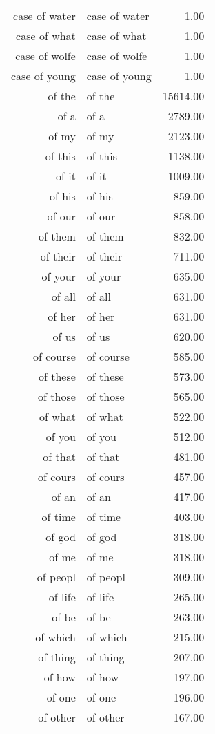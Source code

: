 \begin{table}[ht]
\begin{tabular}{rlr}
  case of water & case of water & 1.00 \\ 
  case of what & case of what & 1.00 \\ 
  case of wolfe & case of wolfe & 1.00 \\ 
  case of young & case of young & 1.00 \\ 
  of the & of the & 15614.00 \\ 
  of a & of a & 2789.00 \\ 
  of my & of my & 2123.00 \\ 
  of this & of this & 1138.00 \\ 
  of it & of it & 1009.00 \\ 
  of his & of his & 859.00 \\ 
  of our & of our & 858.00 \\ 
  of them & of them & 832.00 \\ 
  of their & of their & 711.00 \\ 
  of your & of your & 635.00 \\ 
  of all & of all & 631.00 \\ 
  of her & of her & 631.00 \\ 
  of us & of us & 620.00 \\ 
  of course & of course & 585.00 \\ 
  of these & of these & 573.00 \\ 
  of those & of those & 565.00 \\ 
  of what & of what & 522.00 \\ 
  of you & of you & 512.00 \\ 
  of that & of that & 481.00 \\ 
  of cours & of cours & 457.00 \\ 
  of an & of an & 417.00 \\ 
  of time & of time & 403.00 \\ 
  of god & of god & 318.00 \\ 
  of me & of me & 318.00 \\ 
  of peopl & of peopl & 309.00 \\ 
  of life & of life & 265.00 \\ 
  of be & of be & 263.00 \\ 
  of which & of which & 215.00 \\ 
  of thing & of thing & 207.00 \\ 
  of how & of how & 197.00 \\ 
  of one & of one & 196.00 \\ 
  of other & of other & 167.00 \\ 

\end{tabular}
\end{table}
